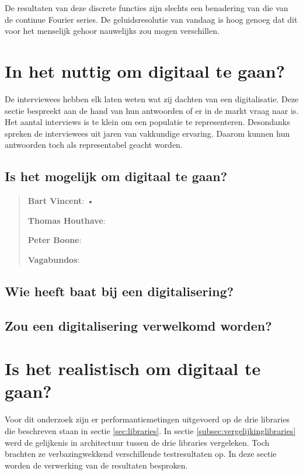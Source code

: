 De resultaten van deze discrete functies zijn slechts een benadering van die van de continue Fourier series. \autocite{fourier} De geluidsresolutie van vandaag is hoog genoeg dat dit voor het menselijk gehoor nauwelijks zou mogen verschillen. \autocite{vagabundos}

\section{In het nuttig om digitaal te gaan?}

De interviewees hebben elk laten weten wat zij dachten van een digitalisatie. Deze sectie bespreekt aan de hand van hun antwoorden of er in de markt vraag naar is. Het aantal interviews is te klein om een populatie te representeren. Desondanks spreken de interviewees uit jaren van vakkundige ervaring. Daarom kunnen hun antwoorden toch als representabel geacht worden.

\subsection{Is het mogelijk om digitaal te gaan?}

\begin{quotation}
\textbf{Bart Vincent}: \textit{•}

\textbf{Thomas Houthave}: 

\textbf{Peter Boone}: 

\textbf{Vagabundos}: 
\end{quotation}



\subsection{Wie heeft baat bij een digitalisering?}



\subsection{Zou een digitalisering verwelkomd worden?}



\section{Is het realistisch om digitaal te gaan?}

Voor dit onderzoek zijn er performantiemetingen uitgevoerd op de drie libraries die beschreven staan in sectie \ref{sec:libraries}. In sectie \ref{subsec:vergelijkinglibraries} werd de gelijkenis in architectuur tussen de drie libraries vergeleken. Toch brachten ze verbazingwekkend verschillende testresultaten op. In deze sectie worden de verwerking van de resultaten besproken. 

